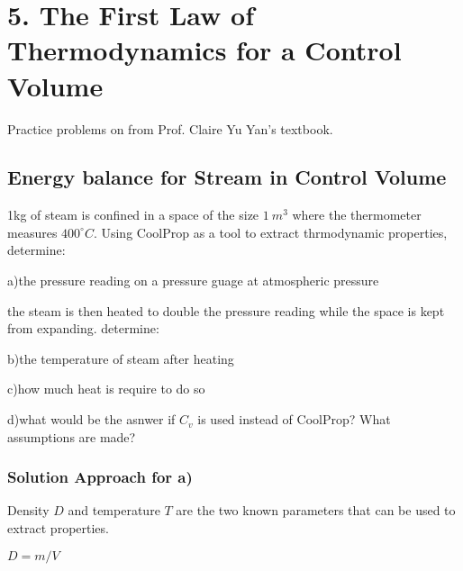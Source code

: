 \documentclass[letterpaper,10pt,english]{jupyterBook}
\begin{document}
\sphinxstepscope


\chapter{5. The First Law of Thermodynamics for a Control Volume}
\label{\detokenize{notebooks/Chapter5/chapter5:the-first-law-of-thermodynamics-for-a-control-volume}}\label{\detokenize{notebooks/Chapter5/chapter5::doc}}
\sphinxAtStartPar
Practice problems on  from Prof. Claire Yu Yan’s textbook.

\sphinxstepscope


\section{Energy balance for Stream in Control Volume}
\label{\detokenize{notebooks/Chapter5/CH5-Q1:energy-balance-for-stream-in-control-volume}}\label{\detokenize{notebooks/Chapter5/CH5-Q1::doc}}
\sphinxAtStartPar
1kg of steam is confined in a space of the size \(1\:m^3\) where the thermometer measures \(400 ^{\circ}  C\). Using CoolProp as a tool to extract thrmodynamic properties, determine:

\sphinxAtStartPar
a)the pressure reading on a pressure guage at atmospheric pressure

\sphinxAtStartPar
the steam is then heated to double the pressure reading while the space is kept from expanding. determine:

\sphinxAtStartPar
b)the temperature of steam after heating

\sphinxAtStartPar
c)how much heat is require to do so

\sphinxAtStartPar
d)what would be the asnwer if \(C_v\) is used instead of CoolProp? What assumptions are made?


\subsection{Solution Approach for a)}
\label{\detokenize{notebooks/Chapter5/CH5-Q1:solution-approach-for-a}}
\sphinxAtStartPar
Density \(D\) and temperature \(T\) are the two known parameters that can be used to extract properties.

\sphinxAtStartPar
\(D=m/V\)
\end{document}
